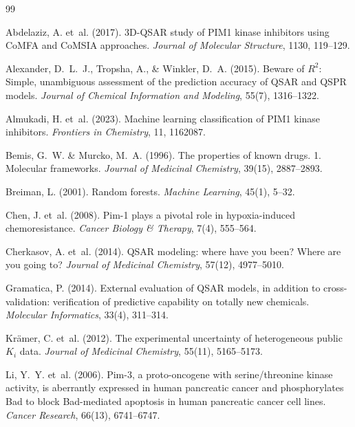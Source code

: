 \documentclass[11pt]{article}
\begin{document}
\begin{thebibliography}{99}

Abdelaziz, A. et~al. (2017).
3D-QSAR study of PIM1 kinase inhibitors using CoMFA and CoMSIA approaches.
\textit{Journal of Molecular Structure}, 1130, 119--129.

Alexander, D.~L.~J., Tropsha, A., \& Winkler, D.~A. (2015).
Beware of $R^2$: Simple, unambiguous assessment of the prediction accuracy of QSAR and QSPR models.
\textit{Journal of Chemical Information and Modeling}, 55(7), 1316--1322.

Almukadi, H. et~al. (2023).
Machine learning classification of PIM1 kinase inhibitors.
\textit{Frontiers in Chemistry}, 11, 1162087.

Bemis, G.~W. \& Murcko, M.~A. (1996).
The properties of known drugs. 1. Molecular frameworks.
\textit{Journal of Medicinal Chemistry}, 39(15), 2887--2893.

Breiman, L. (2001).
Random forests.
\textit{Machine Learning}, 45(1), 5--32.

Chen, J. et~al. (2008).
Pim-1 plays a pivotal role in hypoxia-induced chemoresistance.
\textit{Cancer Biology \& Therapy}, 7(4), 555--564.

Cherkasov, A. et~al. (2014).
QSAR modeling: where have you been? Where are you going to?
\textit{Journal of Medicinal Chemistry}, 57(12), 4977--5010.

Gramatica, P. (2014).
External evaluation of QSAR models, in addition to cross-validation: verification of predictive capability on totally new chemicals.
\textit{Molecular Informatics}, 33(4), 311--314.

Kr\"amer, C. et~al. (2012).
The experimental uncertainty of heterogeneous public $K_i$ data.
\textit{Journal of Medicinal Chemistry}, 55(11), 5165--5173.

Li, Y.~Y. et~al. (2006).
Pim-3, a proto-oncogene with serine/threonine kinase activity, is aberrantly expressed in human pancreatic cancer and phosphorylates Bad to block Bad-mediated apoptosis in human pancreatic cancer cell lines.
\textit{Cancer Research}, 66(13), 6741--6747.


\end{thebibliography}
\end{document}
